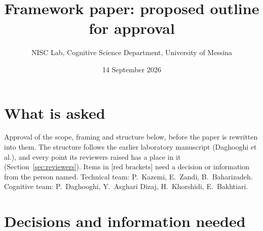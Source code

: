 \documentclass[11pt,a4paper]{article}
\title{Framework paper: proposed outline for approval}
\author{NISC Lab, Cognitive Science Department, University of Messina}
\date{14 September 2026}
\newcommand{\ph}[1]{\textcolor{red!65!black}{[#1]}}
\begin{document}
\maketitle

\section*{What is asked}

Approval of the scope, framing and structure below, before the paper
is rewritten into them. The structure follows the earlier laboratory
manuscript (Daghooghi et al.), and every point its reviewers raised has
a place in it (Section~\ref{sec:reviewers}). Items in \ph{red brackets}
need a decision or information from the person named. Technical team:
P.~Kazemi, E.~Zandi, B.~Baharizadeh. Cognitive team: P.~Daghooghi,
Y.~Asghari Dizaj, H.~Khorshidi, E.~Bakhtiari.

\section{Decisions and information needed}
\label{sec:decisions}
\end{document}
